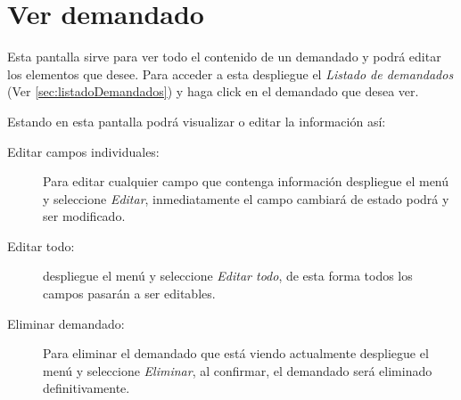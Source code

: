 \section{Ver demandado}
\label{sec:verDemandado}
Esta pantalla sirve para ver todo el contenido de un demandado y
podr\'a editar los elementos que desee. Para acceder a esta
despliegue el \emph{Listado de demandados}
(Ver \ref{sec:listadoDemandados}) y haga click en el demandado que
desea ver.

Estando en esta pantalla podr\'a visualizar o editar la informaci\'on as\'i:

\begin{description}
\item[Editar campos individuales:]Para editar cualquier campo que contenga
informaci\'on despliegue el men\'u \blackberry y seleccione \emph{Editar},
inmediatamente el campo
cambiar\'a de estado podr\'a y ser modificado.
\item[Editar todo:]despliegue el men\'u \blackberry y seleccione \emph{Editar todo},
de esta forma todos los campos pasar\'an a ser editables.
\item[Eliminar demandado:]Para eliminar el demandado que
est\'a viendo actualmente despliegue el men\'u \blackberry y
seleccione \emph{Eliminar}, al confirmar, el demandado ser\'a
eliminado definitivamente.
\end{description}

\guardarVer